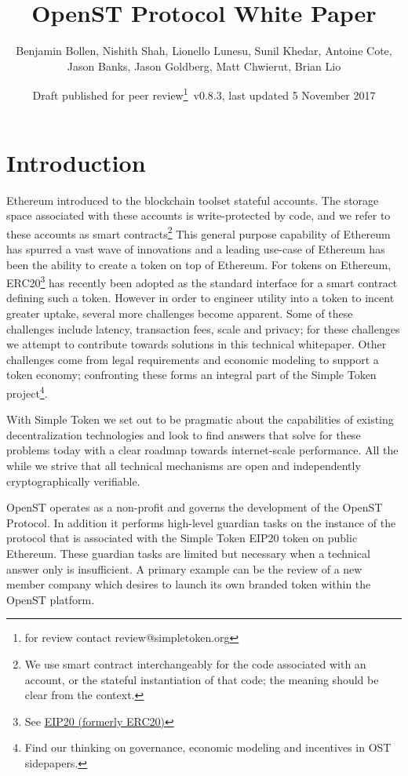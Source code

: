 \documentclass[12pt,a4paper, twocolumn]{article}
\title{{\sc OpenST Protocol White Paper}}
\author{Benjamin Bollen, Nishith Shah, Lionello Lunesu, Sunil Khedar, Antoine Cote,\\ Jason Banks, Jason Goldberg, Matt Chwierut, Brian Lio}
\date{Draft published for peer review\footnote{for review contact review@simpletoken.org}\, v0.8.3, last updated 5 November 2017}
\begin{document}
\onecolumn
\maketitle
\tableofcontents
\newpage
\twocolumn
\section{Introduction}
Ethereum introduced to the blockchain toolset stateful accounts. The storage space associated with these accounts is write-protected by code, and we refer to these accounts as smart contracts\footnote{We use smart contract interchangeably for the code associated with an account, or the stateful instantiation of that code; the meaning should be clear from the context.} This general purpose capability of Ethereum has spurred a vast wave of innovations and a leading use-case of Ethereum has been the ability to create a token on top of Ethereum. For tokens on Ethereum, ERC20\footnote{See \href{https://github.com/ethereum/EIPs/blob/master/EIPS/eip-20.md}{EIP20 (formerly ERC20)}} has recently been adopted as the standard interface for a smart contract defining such a token.  However in order to engineer utility into a token to incent greater uptake, several more challenges become apparent.  Some of these challenges include latency, transaction fees, scale and privacy; for these challenges we attempt to contribute towards solutions in this technical whitepaper.  Other challenges come from legal requirements and economic modeling to support a token economy; confronting these forms an integral part of the Simple Token project\footnote{Find our thinking on governance, economic modeling and incentives in OST sidepapers.}. \par
With Simple Token we set out to be pragmatic about the capabilities of existing decentralization technologies and look to find answers that solve for these problems today with a clear roadmap towards internet-scale performance.  All the while we strive that all technical mechanisms are open and independently cryptographically verifiable. \par
OpenST operates as a non-profit and governs the development of the OpenST Protocol.  In addition it performs high-level guardian tasks on the instance of the protocol that is associated with the Simple Token EIP20 token on public Ethereum.  These guardian tasks are limited but necessary when a technical answer only is insufficient.  A primary example can be the review of a new member company which desires to launch its own branded token within the OpenST platform. \par
\end{document}
